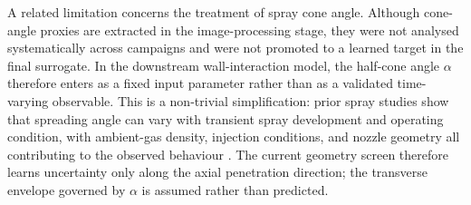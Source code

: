\documentclass[english, 12pt, a4paper, elec, utf8, a-2b, online]{aaltothesis}
\begin{document}
A related limitation concerns the treatment of spray cone angle. Although cone-angle proxies are extracted in the image-processing stage, they were not analysed systematically across campaigns and were not promoted to a learned target in the final surrogate. In the downstream wall-interaction model, the half-cone angle $\alpha$ therefore enters as a fixed input parameter rather than as a validated time-varying observable. This is a non-trivial simplification: prior spray studies show that spreading angle can vary with transient spray development and operating condition, with ambient-gas density, injection conditions, and nozzle geometry all contributing to the observed behaviour \cite{NaberSiebers1996,JungManinSkeenPickett2015}. The current geometry screen therefore learns uncertainty only along the axial penetration direction; the transverse envelope governed by $\alpha$ is assumed rather than predicted.
\end{document}
